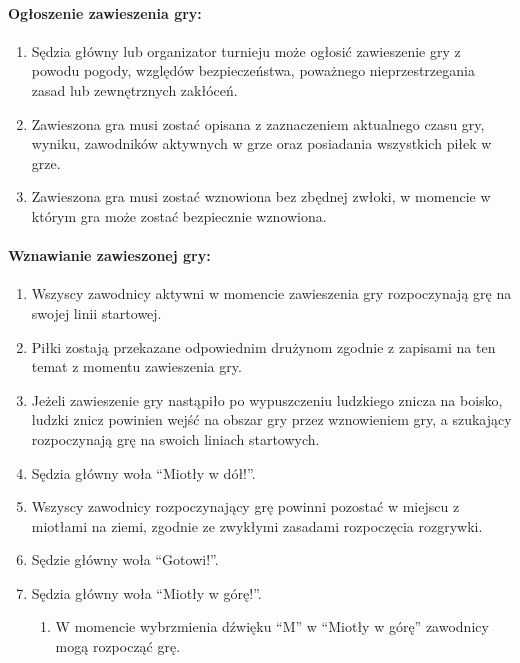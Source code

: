 \documentclass[12pt]{article}
\begin{document}
\paragraph{Ogłoszenie zawieszenia gry:}

\begin{enumerate}
\item
    Sędzia główny lub organizator turnieju może ogłosić zawieszenie gry z
  powodu pogody, względów bezpieczeństwa, poważnego nieprzestrzegania
  zasad lub zewnętrznych zakłóceń.
  \item
    Zawieszona gra musi zostać opisana z zaznaczeniem aktualnego czasu
  gry, wyniku, zawodników aktywnych w grze oraz posiadania wszystkich
  piłek w grze.
  \item
    Zawieszona gra musi zostać wznowiona bez zbędnej zwłoki, w momencie w
  którym gra może zostać bezpiecznie wznowiona.
  \end{enumerate}

\paragraph{Wznawianie zawieszonej gry:}

\begin{enumerate}
\item
    Wszyscy zawodnicy aktywni w momencie zawieszenia gry rozpoczynają grę
  na swojej linii startowej.
  \item
    Piłki zostają przekazane odpowiednim drużynom zgodnie z zapisami na
  ten temat z momentu zawieszenia gry.
  \item
    Jeżeli zawieszenie gry nastąpiło po wypuszczeniu ludzkiego znicza na
  boisko, ludzki znicz powinien wejść na obszar gry przez wznowieniem
  gry, a szukający rozpoczynają grę na swoich liniach startowych.
  \item
    Sędzia główny woła ``Miotły w dół!''.
  \item
    Wszyscy zawodnicy rozpoczynający grę powinni pozostać w miejscu z
  miotłami na ziemi, zgodnie ze zwykłymi zasadami rozpoczęcia rozgrywki.
  \item
    Sędzie główny woła ``Gotowi!''.
  \item
    Sędzia główny woła ``Miotły w górę!''.
  
  \begin{enumerate}
  \item
        W momencie wybrzmienia dźwięku ``M'' w ``Miotły w górę'' zawodnicy
    mogą rozpocząć grę.
      \end{enumerate}
\end{enumerate}
\end{document}
